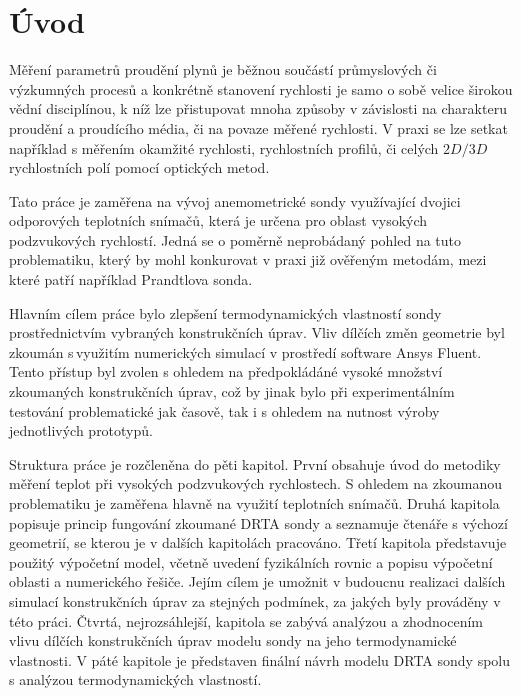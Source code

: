 \section*{Úvod}

    Měření parametrů proudění plynů je běžnou součástí průmyslových či výzkumných procesů a konkrétně stanovení rychlosti je samo o sobě velice širokou vědní disciplínou, k níž lze přistupovat mnoha způsoby v závislosti na charakteru proudění a proudícího média, či na povaze měřené rychlosti. V praxi se lze setkat například s měřením okamžité rychlosti, rychlostních profilů, či celých $2D/3D$ rychlostních polí pomocí optických metod. 
    
    Tato práce je zaměřena na vývoj anemometrické sondy využívající dvojici odporových teplotních snímačů, která je určena pro oblast vysokých podzvukových rychlostí. Jedná se o poměrně neprobádaný pohled na tuto problematiku, který by mohl konkurovat v praxi již ověřeným metodám, mezi které patří například Prandtlova sonda.

    Hlavním cílem práce bylo zlepšení termodynamických vlastností sondy prostřednictvím vybraných konstrukčních úprav. Vliv dílčích změn geometrie byl zkoumán s\,využitím numerických simulací v prostředí software Ansys Fluent. Tento přístup byl zvolen s ohledem na předpokládáné vysoké množství zkoumaných konstrukčních úprav, což by jinak bylo při experimentálním testování problematické jak časově, tak i s ohledem na nutnost výroby jednotlivých prototypů.

    \vspace{\baselineskip}

    Struktura práce je rozčleněna do pěti kapitol. První obsahuje úvod do metodiky měření teplot při vysokých podzvukových rychlostech. S ohledem na zkoumanou problematiku je zaměřena hlavně na využití teplotních snímačů. Druhá kapitola popisuje princip fungování zkoumané DRTA sondy a seznamuje čtenáře s výchozí geometrií, se kterou je v dalších kapitolách pracováno. Třetí kapitola představuje použitý výpočetní model, včetně uvedení fyzikálních rovnic a popisu výpočetní oblasti a numerického řešiče. Jejím cílem je umožnit v budoucnu realizaci dalších simulací konstrukčních úprav za stejných podmínek, za jakých byly prováděny v této práci. Čtvrtá, nejrozsáhlejší, kapitola se zabývá analýzou a zhodnocením vlivu dílčích konstrukčních úprav modelu sondy na jeho termodynamické vlastnosti. V páté kapitole je představen finální návrh modelu DRTA sondy spolu s analýzou termodynamických vlastností. 



    